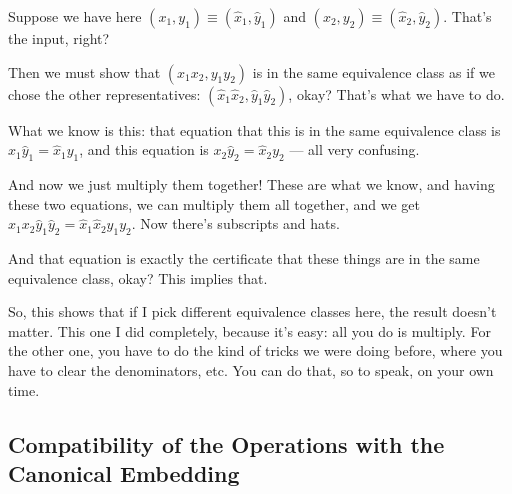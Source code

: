 \begin{speech}[01:03:40 - 01:05:45]
Suppose we have here $(x_1, y_1) \equiv (\hat{x}_1, \hat{y}_1)$  and $(x_2, y_2) \equiv (\hat{x}_2, \hat{y}_2)$.  That's the input, right?

Then we must show  that $(x_1 x_2, y_1 y_2)$ is in the same equivalence class as if we chose the other representatives: $(\hat{x}_1 \hat{x}_2, \hat{y}_1 \hat{y}_2)$,  okay? That's what we have to do.

What we know is this: that equation that this is in the same equivalence class is $x_1 \hat{y}_1 = \hat{x}_1 y_1$,  and this equation is $x_2 \hat{y}_2 = \hat{x}_2 y_2$  --- all very confusing.

And now we just multiply them together! These are what we know, and having these two equations, we can multiply them all together, and we get $x_1 x_2 \hat{y}_1 \hat{y}_2 = \hat{x}_1 \hat{x}_2 y_1 y_2$.  Now there's subscripts and hats.

And that equation is exactly the certificate that these things are in the same equivalence class, okay?  This implies that.

So, this shows that if I pick different equivalence classes here, the result doesn't matter. This one I did completely, because it's easy: all you do is multiply. For the other one, you have to do the kind of tricks we were doing before, where you have to clear the denominators, etc. You can do that, so to speak, on your own time.
\end{speech}

\subsection{Compatibility of the Operations with the Canonical Embedding}

